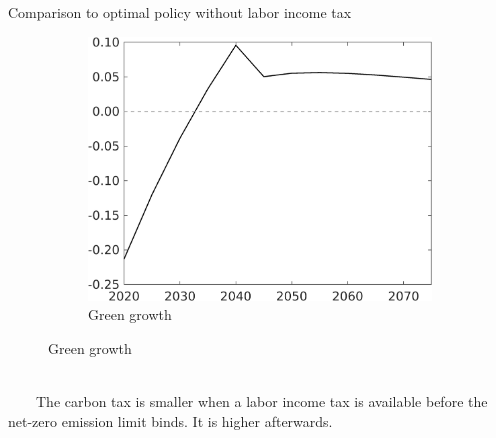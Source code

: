 \documentclass[11pt,aspectratio=169]{beamer}
\begin{document}
\begin{frame}{Comparison to optimal policy without labor income tax}
\begin{figure}[h!!]
\begin{subfigure}{0.32\textwidth}
\end{subfigure}
	\begin{subfigure}{0.32\textwidth}		
	\caption{Green growth}
	\includegraphics[width=1\textwidth]{../codding_model/own_basedOnFried/optimalPol_010922_revision/figures/all_13Sept22_Tplus30/gAg_OPT_COMPtaulPer_regime4_spillover0_knspil0_noskill0_sep0_xgrowth0_PV1_etaa0.79.png}
\end{subfigure}
\end{figure}
\vspace{5mm}
\begin{block}{}
	\ \\
	\ \ \ \ The carbon tax is smaller when a labor income tax is available before the net-zero emission limit binds. It is higher afterwards.\  \ \\ \ 
\end{block}	
\end{frame}
\end{document}
